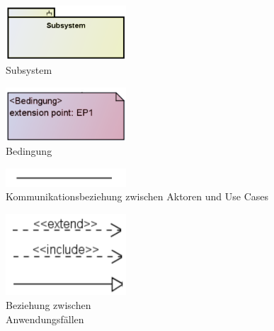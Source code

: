 \documentclass[11pt, a4paper]{article}
\begin{document}
\vspace{1em}

\begin{figure}[ht]
    \centering
    \begin{minipage}[t]{0.45\textwidth}
        \centering \includegraphics[width=0.4\textwidth]{UseCase-08.png} \\
        \vspace{1em}
        \centering Subsystem
    \end{minipage}
    \centering
    \begin{minipage}[t]{0.45\textwidth}
        \centering \includegraphics[width=0.4\textwidth]{UseCase-09.png} \\
        \vspace{1em}
        \centering Bedingung
    \end{minipage}
\end{figure}

\vspace{1em}

\begin{figure}[ht]
    \centering
    \begin{minipage}[t]{0.45\textwidth}
        \centering \includegraphics[width=0.4\textwidth]{UseCase-03.png} \\
        \vspace{1em}
        \centering Kommunikationsbeziehung zwischen Aktoren und Use Cases
    \end{minipage}
    \centering
    \begin{minipage}[t]{0.45\textwidth}
        \centering \includegraphics[width=0.4\textwidth]{UseCase-04.png} \\
        \vspace{1em}
        \centering Beziehung zwischen \\ Anwendungsfällen
    \end{minipage}
\end{figure}
\end{document}
